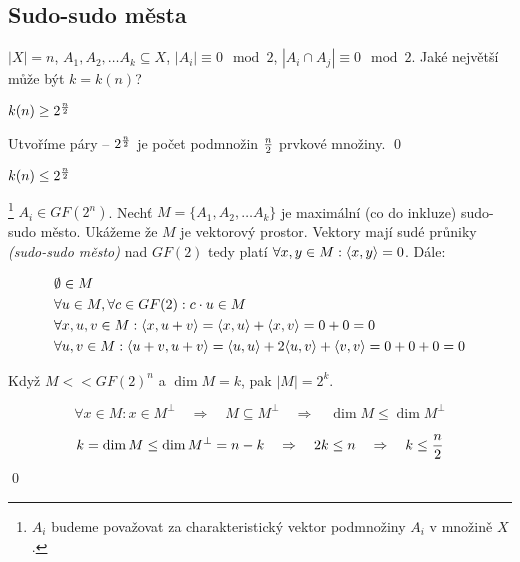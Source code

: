 \subsection{Sudo-sudo města}


\df $|X| = n$, $A_1, A_2, \dots A_k \subseteq X$, $|A_i| \equiv 0 \mod 2$, $|A_i\cap A_j| \equiv 0 \mod 2$. Jaké největší může být $k = k(n)$?

\vt $k(n) \ge 2^{n\over 2}$

\dk Utvoříme páry -- $2^{n\over 2}$ je počet podmnožin $n\over 2$ prvkové množiny. \qed

\vt $k(n) \le 2^{n\over 2}$

\dk\footnote{$A_i$ budeme považovat za charakteristický vektor podmnožiny $A_i$
v množině $X$.} $A_i \in GF(2^n)$. Nechť $M=\{A_1, A_2, \dots A_k\}$ je maximální (co do inkluze)
sudo-sudo město. Ukážeme že $M$ je vektorový prostor.
Vektory mají sudé průniky {\it (sudo-sudo město)} nad $GF(2)$ tedy platí $\forall x,y\in M: {\langle x,y\rangle} = 0$.
Dále:

\begin{align}
	&\emptyset \in M \\
	&\forall u \in M, \forall c\in GF(2): c\cdot u \in M \\
	&\forall x,u,v\in M: {\langle x, u+v\rangle} = {\langle x,u\rangle} + {\langle x,v\rangle} = 0 + 0 = 0 \\
	&\forall u,v \in M: {\langle u+v,u+v\rangle} = {\langle u,u\rangle} + 2{\langle u,v\rangle} + {\langle v,v\rangle} = 0 + 0 + 0 = 0
\end{align}

Když $M << GF(2)^n$ a $\dim M = k$, pak $|M| = 2^k$. 

$$\forall x\in M: x\in M^\bot \quad\Rightarrow\quad M\subseteq M^\bot \quad\Rightarrow\quad \dim M \le \dim M^\bot$$

$$k = \dim M \le \dim M^\bot = n-k \quad\Rightarrow\quad 2k \le n \quad\Rightarrow\quad k \le {n\over 2}$$
\qed


